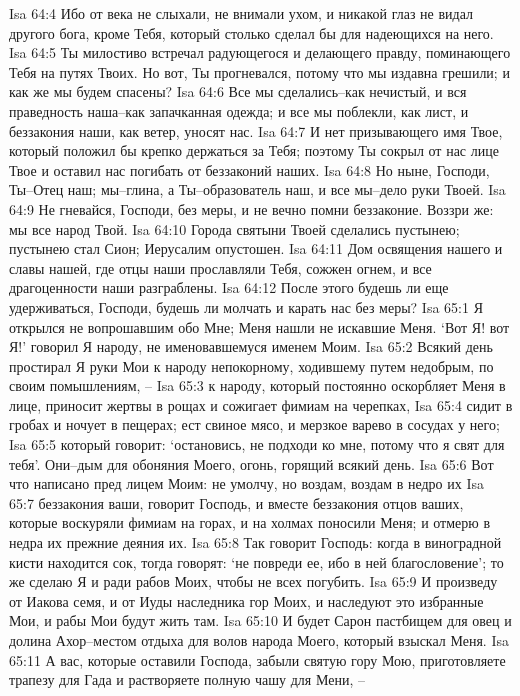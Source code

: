 Isa 64:4  Ибо от века не слыхали, не внимали ухом, и никакой глаз не видал другого бога, кроме Тебя, который столько сделал бы для надеющихся на него.
Isa 64:5  Ты милостиво встречал радующегося и делающего правду, поминающего Тебя на путях Твоих. Но вот, Ты прогневался, потому что мы издавна грешили; и как же мы будем спасены?
Isa 64:6  Все мы сделались--как нечистый, и вся праведность наша--как запачканная одежда; и все мы поблекли, как лист, и беззакония наши, как ветер, уносят нас.
Isa 64:7  И нет призывающего имя Твое, который положил бы крепко держаться за Тебя; поэтому Ты сокрыл от нас лице Твое и оставил нас погибать от беззаконий наших.
Isa 64:8  Но ныне, Господи, Ты--Отец наш; мы--глина, а Ты--образователь наш, и все мы--дело руки Твоей.
Isa 64:9  Не гневайся, Господи, без меры, и не вечно помни беззаконие. Воззри же: мы все народ Твой.
Isa 64:10  Города святыни Твоей сделались пустынею; пустынею стал Сион; Иерусалим опустошен.
Isa 64:11  Дом освящения нашего и славы нашей, где отцы наши прославляли Тебя, сожжен огнем, и все драгоценности наши разграблены.
Isa 64:12  После этого будешь ли еще удерживаться, Господи, будешь ли молчать и карать нас без меры?
Isa 65:1  Я открылся не вопрошавшим обо Мне; Меня нашли не искавшие Меня. `Вот Я! вот Я!' говорил Я народу, не именовавшемуся именем Моим.
Isa 65:2  Всякий день простирал Я руки Мои к народу непокорному, ходившему путем недобрым, по своим помышлениям, --
Isa 65:3  к народу, который постоянно оскорбляет Меня в лице, приносит жертвы в рощах и сожигает фимиам на черепках,
Isa 65:4  сидит в гробах и ночует в пещерах; ест свиное мясо, и мерзкое варево в сосудах у него;
Isa 65:5  который говорит: `остановись, не подходи ко мне, потому что я свят для тебя'. Они--дым для обоняния Моего, огонь, горящий всякий день.
Isa 65:6  Вот что написано пред лицем Моим: не умолчу, но воздам, воздам в недро их
Isa 65:7  беззакония ваши, говорит Господь, и вместе беззакония отцов ваших, которые воскуряли фимиам на горах, и на холмах поносили Меня; и отмерю в недра их прежние деяния их.
Isa 65:8  Так говорит Господь: когда в виноградной кисти находится сок, тогда говорят: `не повреди ее, ибо в ней благословение'; то же сделаю Я и ради рабов Моих, чтобы не всех погубить.
Isa 65:9  И произведу от Иакова семя, и от Иуды наследника гор Моих, и наследуют это избранные Мои, и рабы Мои будут жить там.
Isa 65:10  И будет Сарон пастбищем для овец и долина Ахор--местом отдыха для волов народа Моего, который взыскал Меня.
Isa 65:11  А вас, которые оставили Господа, забыли святую гору Мою, приготовляете трапезу для Гада и растворяете полную чашу для Мени, --
